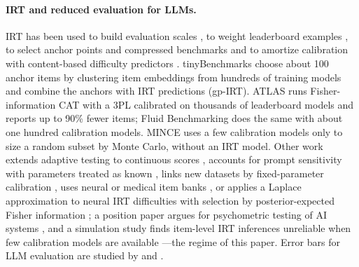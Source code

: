 \paragraph{IRT and reduced evaluation for LLMs.} IRT has been used to build evaluation
scales \citep{lalor2016building}, to weight leaderboard examples
\citep{rodriguez2021evaluation}, to select anchor points and compressed benchmarks
\citep{vivek2024anchor,polo2024tinybenchmarks,kipnis2025metabench} and to amortize
calibration with content-based difficulty predictors \citep{truong2025reliable}.
tinyBenchmarks \citep{polo2024tinybenchmarks} choose about 100 anchor items by clustering
item embeddings from hundreds of training models and combine the anchors with IRT
predictions (gp-IRT). ATLAS \citep{li2026atlas} runs Fisher-information CAT with a 3PL
calibrated on thousands of leaderboard models and reports up to 90\% fewer items;
Fluid Benchmarking \citep{hofmann2025fluid} does the same with about one hundred
calibration models. MINCE \citep{das2026mince} uses a few calibration models only to size
a random subset by Monte Carlo, without an IRT model. Other work extends adaptive testing
to continuous scores \citep{balkir2026confident}, accounts for prompt sensitivity with
parameters treated as known \citep{jo2025measure}, links new datasets by fixed-parameter
calibration \citep{habba2026growing}, uses neural or medical item banks
\citep{zhou2026lost,zheng2026medcat}, or applies a Laplace approximation to neural IRT
difficulties with selection by posterior-expected Fisher information
\citep{mandujano2026laplace}; a position paper argues for psychometric testing of AI
systems \citep{zhuang2025position}, and a simulation study finds item-level IRT
inferences unreliable when few calibration models are available
\citep{jiang2026trust}---the regime of this paper. Error bars for LLM evaluation are
studied by \citet{madaan2024quantifying} and \citet{miller2024adding}.

